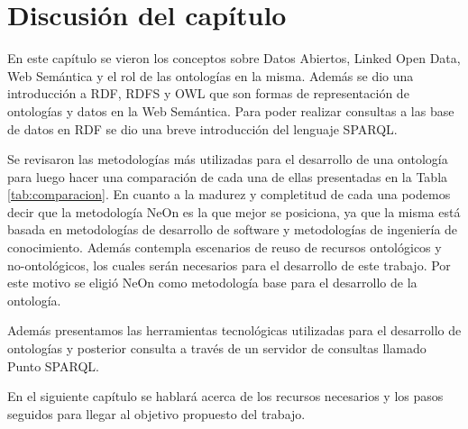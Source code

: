 \section{Discusión del capítulo}
En este capítulo se vieron los conceptos sobre Datos Abiertos, Linked Open Data, Web Semántica y el rol de las ontologías en la misma. Además se dio una introducción a RDF, RDFS y OWL que son formas de representación de ontologías y datos en la Web Semántica. Para poder realizar consultas a las base de datos en RDF se dio una breve introducción del lenguaje SPARQL.

Se revisaron las metodologías más utilizadas para el desarrollo de una ontología para luego hacer una comparación de cada una de ellas presentadas en la Tabla \ref{tab:comparacion}. En cuanto a la madurez y completitud de cada una podemos decir que la metodología NeOn es la que mejor se posiciona, ya que la misma está basada en metodologías de desarrollo de software y metodologías de ingeniería de conocimiento. Además contempla escenarios de reuso de recursos ontológicos y no-ontológicos, los cuales serán necesarios para el desarrollo de este trabajo. Por este motivo se eligió NeOn como metodología base para el desarrollo de la ontología.

Además presentamos las herramientas tecnológicas utilizadas para el desarrollo de ontologías y posterior consulta a través de un servidor de consultas llamado Punto SPARQL.

En el siguiente capítulo se hablará acerca de los recursos necesarios y los pasos seguidos para llegar al objetivo propuesto del trabajo.
